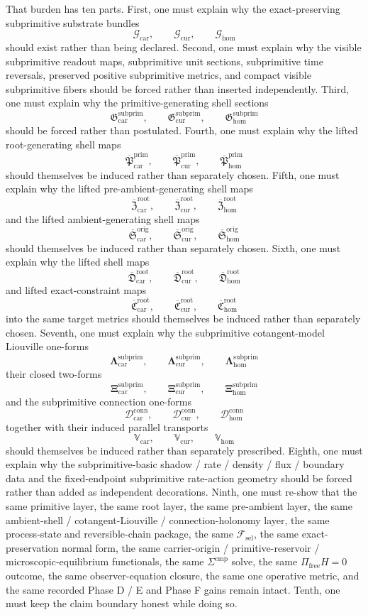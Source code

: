 \documentclass[11pt]{article}
\newcommand{\StemFunctional}{\mathscr F_{\mathrm{sel}}}
\newcommand{\Car}{\mathrm{car}}
\newcommand{\Cur}{\mathrm{cur}}
\newcommand{\Hom}{\mathrm{hom}}
\newcommand{\SubprimSpace}[1]{\mathcal G_{#1}}
\newcommand{\SubprimSection}[1]{\mathfrak G_{#1}^{\mathrm{subprim}}}
\newcommand{\SubprimLiftedRoot}[1]{\overline{\mathfrak P}_{#1}^{\mathrm{prim}}}
\newcommand{\SubprimLiftedPreAmbient}[1]{\overline{\mathfrak Z}_{#1}^{\mathrm{root}}}
\newcommand{\SubprimLiftedAmbient}[1]{\overline{\mathfrak S}_{#1}^{\mathrm{orig}}}
\newcommand{\SubprimLiftedShell}[1]{\overline{\mathfrak D}_{#1}^{\mathrm{root}}}
\newcommand{\SubprimConstraintMap}[1]{\overline{\mathfrak C}_{#1}^{\mathrm{root}}}
\newcommand{\SubprimLiouville}[1]{\boldsymbol{\Lambda}_{#1}^{\mathrm{subprim}}}
\newcommand{\SubprimTwo}[1]{\boldsymbol{\Xi}_{#1}^{\mathrm{subprim}}}
\newcommand{\SubprimConnectionForm}[1]{\mathcal D_{#1}^{\mathrm{conn}}}
\newcommand{\SubprimTransport}[1]{\mathbb V_{#1}}
\begin{document}
That burden has ten parts. First, one must explain why the exact-preserving subprimitive substrate bundles
\[
\SubprimSpace{\Car},\qquad
\SubprimSpace{\Cur},\qquad
\SubprimSpace{\Hom}
\]
should exist rather than being declared. Second, one must explain why the visible subprimitive readout maps, subprimitive unit sections, subprimitive time reversals, preserved positive subprimitive metrics, and compact visible subprimitive fibers should be forced rather than inserted independently. Third, one must explain why the primitive-generating shell sections
\[
\SubprimSection{\Car},\qquad
\SubprimSection{\Cur},\qquad
\SubprimSection{\Hom}
\]
should be forced rather than postulated. Fourth, one must explain why the lifted root-generating shell maps
\[
\SubprimLiftedRoot{\Car},\qquad
\SubprimLiftedRoot{\Cur},\qquad
\SubprimLiftedRoot{\Hom}
\]
should themselves be induced rather than separately chosen. Fifth, one must explain why the lifted pre-ambient-generating shell maps
\[
\SubprimLiftedPreAmbient{\Car},\qquad
\SubprimLiftedPreAmbient{\Cur},\qquad
\SubprimLiftedPreAmbient{\Hom}
\]
and the lifted ambient-generating shell maps
\[
\SubprimLiftedAmbient{\Car},\qquad
\SubprimLiftedAmbient{\Cur},\qquad
\SubprimLiftedAmbient{\Hom}
\]
should themselves be induced rather than separately chosen. Sixth, one must explain why the lifted shell maps
\[
\SubprimLiftedShell{\Car},\qquad
\SubprimLiftedShell{\Cur},\qquad
\SubprimLiftedShell{\Hom}
\]
and lifted exact-constraint maps
\[
\SubprimConstraintMap{\Car},\qquad
\SubprimConstraintMap{\Cur},\qquad
\SubprimConstraintMap{\Hom}
\]
into the same target metrics should themselves be induced rather than separately chosen. Seventh, one must explain why the subprimitive cotangent-model Liouville one-forms
\[
\SubprimLiouville{\Car},\qquad
\SubprimLiouville{\Cur},\qquad
\SubprimLiouville{\Hom}
\]
their closed two-forms
\[
\SubprimTwo{\Car},\qquad
\SubprimTwo{\Cur},\qquad
\SubprimTwo{\Hom}
\]
and the subprimitive connection one-forms
\[
\SubprimConnectionForm{\Car},\qquad
\SubprimConnectionForm{\Cur},\qquad
\SubprimConnectionForm{\Hom}
\]
together with their induced parallel transports
\[
\SubprimTransport{\Car},\qquad
\SubprimTransport{\Cur},\qquad
\SubprimTransport{\Hom}
\]
should themselves be induced rather than separately prescribed. Eighth, one must explain why the subprimitive-basic shadow / rate / density / flux / boundary data and the fixed-endpoint subprimitive rate-action geometry should be forced rather than added as independent decorations. Ninth, one must re-show that the same primitive layer, the same root layer, the same pre-ambient layer, the same ambient-shell / cotangent-Liouville / connection-holonomy layer, the same process-state and reversible-chain package, the same \(\StemFunctional\), the same exact-preservation normal form, the same carrier-origin / primitive-reservoir / microscopic-equilibrium functionals, the same \(\Sigma^{\mathrm{cmp}}\) solve, the same \(\Pi_{\mathrm{free}}H=0\) outcome, the same observer-equation closure, the same one operative metric, and the same recorded Phase D / E and Phase F gains remain intact. Tenth, one must keep the claim boundary honest while doing so.
\end{document}
